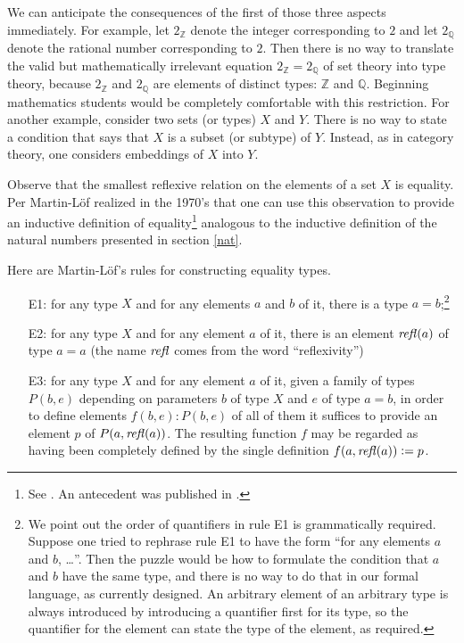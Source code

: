 \documentclass[letter,12pt]{amsart}
\theoremstyle{definition}
\theoremstyle{remark}
\numberwithin{equation}{section}
\newcommand{\refl}{\mathop{{\it refl}}}
\newcommand{\QQ}{\mathbb{Q}}
\newcommand{\ZZ}{\mathbb{Z}}
\newcommand{\defeq}{\vcentcolon=}
\begin{document}
We can anticipate the consequences of the first of those three aspects immediately.  For example, let $2_\ZZ$ denote the integer corresponding
to $2$ and let $2_\QQ$ denote the rational number corresponding to $2$.  Then there is no way to translate the valid but mathematically
irrelevant equation $2_\ZZ = 2_\QQ$ of set theory into type theory, because $2_\ZZ$ and $2_\QQ$ are elements of distinct types: $\ZZ$ and $\QQ$.
Beginning mathematics students would be completely comfortable with this restriction.  For another example, consider two sets (or types) $X$ and
$Y$.  There is no way to state a condition that says that $X$ is a subset (or subtype) of $Y$.  Instead, as in category theory, one considers
embeddings of $X$ into $Y$.

Observe that the smallest reflexive relation on the elements of a set $X$ is equality.  Per Martin-L\"of realized in the 1970's that one can use
this observation to provide an inductive definition of equality\footnote{See \citep[section 1.7]{MR0387009}.  An antecedent was published in
  \citep[section 3.8.2, p.{} 190]{MR0387023}.} analogous to the inductive definition of the natural numbers presented in section \ref{nat}.

Here are Martin-L\"of's rules for constructing equality types.
\begin{enumerate}
\item[E1:]
  for any type $X$ and for any elements $a$ and $b$ of it, there is a type $a=b$;\footnote{
    We point out the order of quantifiers in rule E1 is grammatically required.  Suppose one tried to rephrase rule E1 to have the form
    ``for any elements $a$ and $b$, \dots''.  Then the puzzle would be how to formulate the condition that $a$ and $b$ have the same type, and there
    is no way to do that in our formal language, as currently designed.  An arbitrary element of an arbitrary type is always introduced by %
    introducing a quantifier first for its type, so the quantifier for the element can state the type of the element, as required.
  }
\item[E2:] for any type $X$ and for any element $a$ of it, there is an element $\refl(a)$ of type $a=a$ (the name $\refl$ comes from the word
  ``reflexivity'')
\item[E3:] for any type $X$ and for any element $a$ of it, given a family of types $P(b,e)$ depending on parameters $b$ of type $X$ and $e$ of type
  $a=b$, in order to define elements $f(b,e) : P(b,e)$ of all of them it suffices to provide an element $p$ of $P(a,\refl(a))$.  The resulting
  function $f$ may be regarded as having been completely defined by the single definition $f(a,\refl(a)) \defeq p$.
\end{enumerate}
\end{document}
